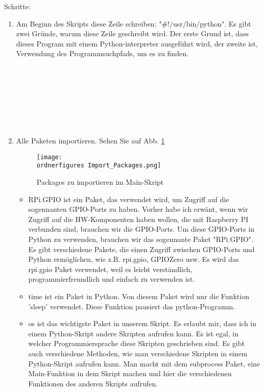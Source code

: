 Schritte: 
\begin{enumerate}
	
	\item Am Beginn des Skripts diese Zeile schreiben: "\#!/usr/bin/python". Es gibt zwei Gr\"unde, warum diese Zeile geschreibt wird. Der erste Grund ist, dass dieses Program mit einem Python-interpreter ausgef\"uhrt wird, der zweite ist, Verwendung des Programmsuchpfads, um es zu finden. \\ \\ \\ \\ \\ \\ \\ \\ 
	 \item Alle Paketen importieren. Sehen Sie auf Abb. \ref{fig:Packages zu importieren} 
	 \begin{figure}[H]
	 	\texttt{[image: \\ordnerfigures Import\_Packages.png]}
	 	\caption{Packages zu importieren im Main-Skript}
	 	\label{fig:Packages zu importieren}
	 \end{figure}
	 \begin{itemize}
	 	
	 \item RPi.GPIO ist ein Paket, das verwendet wird, um Zugriff auf die sogennanten GPIO-Ports zu haben. Vorher habe ich erw\"ant, wenn wir Zugriff auf die HW-Komponenten haben wollen, die mit Raspberry PI verbunden sind, brauchen wir die GPIO-Ports. Um diese GPIO-Ports in Python zu verwenden, brauchen wir das sogennante Paket "RPi.GPIO". Es gibt verschiedene Pakete, die einen Zugriff zwischen GPIO-Ports und Python erm\"oglichen, wie z.B. rpi.gpio, GPIOZero usw. Es wird das rpi.gpio Paket verwendet, weil es leicht verst\"andlich, programmierfreundlich und einfach zu verwenden ist. \cite{rpigpio}
	 
	 \item time ist ein Paket in Python. Von diesem Paket wird nur die Funktion 'sleep' verwendet. Diese Funktion pausiert das python-Programm. \cite{timepackage}
	 
	 \item os ist das wichtigste Paket in unserem Skript. Es erlaubt mir, dass ich in einem Python-Skript andere Skripten aufrufen kann. Es ist egal, in welcher Programmiersprache diese Skripten geschrieben sind. Es gibt auch verschiedene Methoden, wie man verschiedene Skripten in einem Python-Skript aufrufen kann. Man macht mit dem subprocess Paket, eine Main-Funktion in dem Skript machen und hier die verschiedenen Funktionen des anderen Skripts aufrufen. 
	 

\end{itemize}
\end{enumerate}
